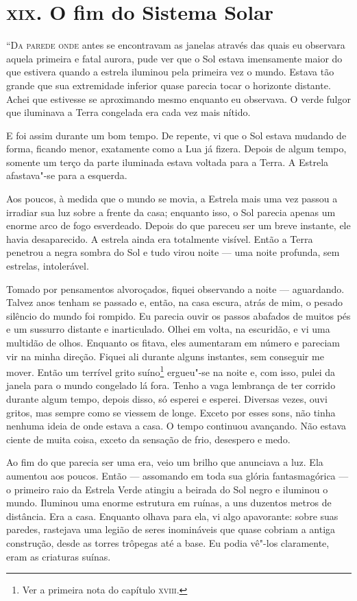 \clearpage

\chapter{\textsc{xix}. O fim do Sistema Solar}

\textsc{“Da parede onde} antes se encontravam as janelas através das quais eu observara aquela primeira e fatal aurora, pude ver
que o Sol estava imensamente maior do que estivera quando a estrela iluminou pela primeira vez o mundo. Estava tão
grande que sua extremidade inferior quase parecia tocar o horizonte distante. Achei que estivesse se aproximando mesmo
enquanto eu observava. O verde fulgor que iluminava a Terra congelada era cada vez mais nítido.

E foi assim durante um bom tempo. De repente, vi que o Sol estava mudando de forma, ficando menor, exatamente como a
Lua já fizera. Depois de algum tempo, somente um terço da parte iluminada estava voltada para a Terra. A
Estrela afastava"-se para a esquerda.

Aos poucos, à medida que o mundo se movia, a Estrela mais uma vez passou a irradiar sua luz sobre a frente da casa;
enquanto isso, o Sol parecia apenas um enorme arco de fogo esverdeado. Depois do que pareceu ser um breve instante, ele
havia desaparecido. A estrela ainda era totalmente visível. Então a Terra penetrou a negra sombra do Sol e tudo virou
noite --- uma noite profunda, sem estrelas, intolerável.

Tomado por pensamentos alvoroçados, fiquei observando a noite --- aguardando. Talvez anos tenham se passado e, então, na
casa escura, atrás de mim, o pesado silêncio do mundo foi rompido. Eu parecia ouvir os passos abafados de muitos pés e
um sussurro distante e inarticulado. Olhei em volta, na escuridão, e vi uma multidão de olhos. Enquanto os fitava, eles
aumentaram em número e pareciam vir na minha direção. Fiquei ali durante alguns instantes, sem conseguir me
mover. Então um terrível grito suíno\footnote{ Ver a primeira nota do
capítulo \textsc{xviii}.} ergueu"-se na noite e, com isso, pulei da janela para o mundo congelado lá
fora. Tenho a vaga lembrança de ter corrido durante algum tempo, depois disso, só esperei e esperei. Diversas vezes,
ouvi gritos, mas sempre como se viessem de longe. Exceto por esses sons, não tinha nenhuma ideia de onde estava a casa.
O tempo continuou avançando. Não estava ciente de muita coisa, exceto da sensação de frio, desespero e medo.

Ao fim do que parecia ser uma era, veio um brilho que anunciava a luz. Ela aumentou aos poucos. Então --- assomando em
toda sua glória fantasmagórica --- o primeiro raio da Estrela Verde atingiu a beirada do Sol negro e iluminou o mundo.
Iluminou uma enorme estrutura em ruínas, a uns duzentos metros de distância. Era a casa. Enquanto olhava para ela, vi
algo apavorante: sobre suas paredes, rastejava uma legião de seres inomináveis que quase cobriam a antiga construção,
desde as torres trôpegas até a base. Eu podia vê"-los claramente, eram as criaturas suínas.

